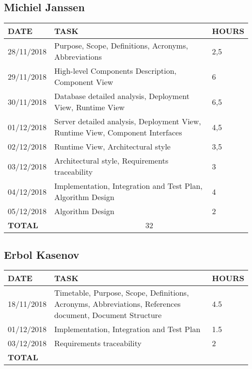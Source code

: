 \documentclass[12pt]{article}
\begin{document}
\subsection{Michiel Janssen}

\begin{center}
\begin{tabular}{ |p{}|p{}|p{}| } 
 \hline
 \textbf{DATE} & \textbf{TASK} & \textbf{HOURS} \\ 
 \hline 
  28/11/2018 & Purpose, Scope, Definitions, Acronyms, Abbreviations & 2,5\\
  \hline
  29/11/2018 & High-level Components Description, Component View & 6\\
  \hline
  30/11/2018 & Database detailed analysis, Deployment View, Runtime View & 6,5\\
  \hline
  01/12/2018 & Server detailed analysis, Deployment View, Runtime View, Component Interfaces & 4,5\\
  \hline
  02/12/2018 & Runtime View, Architectural style & 3,5\\
  \hline
  03/12/2018 & Architectural style, Requirements traceability & 3\\
  \hline
  04/12/2018 & Implementation, Integration and Test Plan, Algorithm Design & 4 \\
  \hline
  05/12/2018 & Algorithm Design & 2\\
  \hline
  \textbf{TOTAL} & \multicolumn{2}{c|}{32} \\ 
  \hline
\end{tabular}
\end{center}


\subsection{Erbol Kasenov}

\begin{center}
\begin{tabular}{ |p{}|p{}|p{}| } 
 \hline
 \textbf{DATE} & \textbf{TASK} & \textbf{HOURS} \\ 
  \hline
  18/11/2018 & Timetable, Purpose, Scope, Definitions, Acronyms, 
  Abbreviations, References document, Document Structure & 4.5\\ 
  \hline
  01/12/2018 & Implementation, Integration and Test Plan & 1.5\\ 
   \hline
  03/12/2018 & Requirements traceability & 2 \\ 
  \hline
  \textbf{TOTAL} & \multicolumn{2}{c|}{} \\ 
  \hline
\end{tabular}
\end{center}
\end{document}

